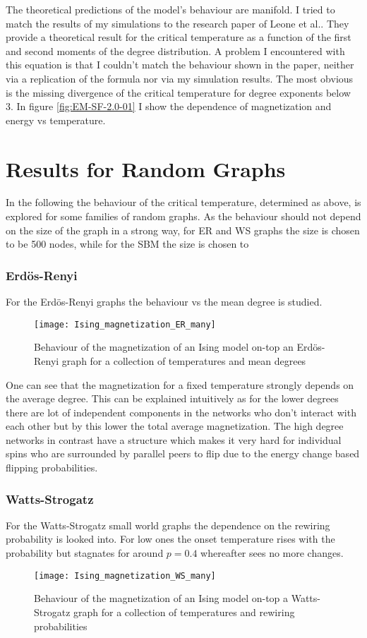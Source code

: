 The theoretical predictions of the model's behaviour are manifold.
I tried to match the results of my simulations to the research paper of Leone et al.\cite{Leone2002}.
They provide a theoretical result for the critical temperature as a function of the first and second moments of the degree distribution.
A problem I encountered with this equation is that I couldn't match the behaviour shown in the paper, neither via a replication of the formula nor via my simulation results.
The most obvious is the missing divergence of the critical temperature for degree exponents below 3.
In figure \ref{fig:EM-SF-2.0-01} I show the dependence of magnetization and energy vs temperature.

\section{Results for Random Graphs}
In the following the behaviour of the critical temperature, determined as above, is explored for some families of random graphs. As the behaviour should not depend on the size of the graph in a strong way, for ER and WS graphs the size is chosen to be 500 nodes, while for the SBM the size is chosen to 
\subsubsection{Erdös-Renyi}
For the Erdös-Renyi graphs the behaviour vs the mean degree is studied.
\begin{figure}[h]
	\centering
	\texttt{[image: Ising\_magnetization\_ER\_many]}
	\caption{Behaviour of the magnetization of an Ising model on-top an Erdös-Renyi graph for a collection of temperatures and mean degrees}
	\label{fig:M-ER-0.1}
\end{figure}
One can see that the magnetization for a fixed temperature strongly depends on the average degree.
This can be explained intuitively as for the lower degrees there are lot of independent components in the networks who don't interact with each other but by this lower the total average magnetization.
The high degree networks in contrast have a structure which makes it very hard for individual spins who are surrounded by parallel peers to flip due to the energy change based flipping probabilities.


\subsubsection{Watts-Strogatz}
For the Watts-Strogatz small world graphs the dependence on the rewiring probability is looked into. For low ones the onset temperature rises with the probability but stagnates for around $p=0.4$ whereafter sees no more changes.
\begin{figure}[h]
	\centering
	\texttt{[image: Ising\_magnetization\_WS\_many]}
	\caption{Behaviour of the magnetization of an Ising model on-top a Watts-Strogatz graph for a collection of temperatures and rewiring probabilities}
	\label{fig:M-WS-0.1}
\end{figure}

